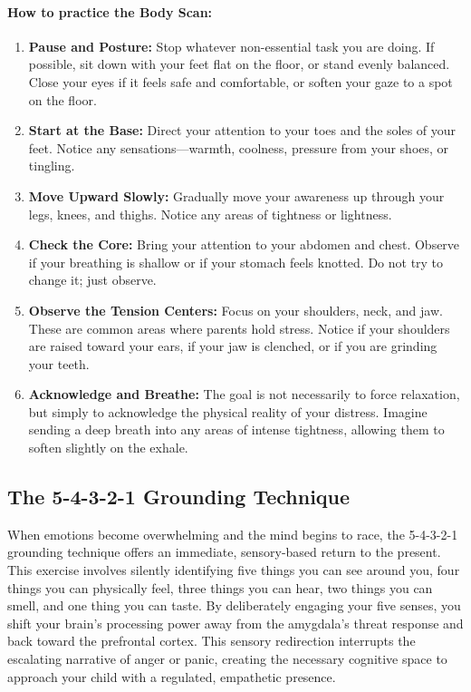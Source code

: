 \paragraph{How to practice the Body Scan:}
\begin{enumerate}
    \item \textbf{Pause and Posture:} Stop whatever non-essential task you are doing. 
    If possible, sit down with your feet flat on the floor, or stand evenly balanced. 
    Close your eyes if it feels safe and comfortable, or soften your gaze to a spot on the floor.
    \item \textbf{Start at the Base:} Direct your attention to your toes and the soles of your feet. 
    Notice any sensations---warmth, coolness, pressure from your shoes, or tingling.
    \item \textbf{Move Upward Slowly:} Gradually move your awareness up through your legs, knees, and thighs. 
    Notice any areas of tightness or lightness.
    \item \textbf{Check the Core:} Bring your attention to your abdomen and chest. 
    Observe if your breathing is shallow or if your stomach feels knotted. Do not try to change it; just observe.
    \item \textbf{Observe the Tension Centers:} Focus on your shoulders, neck, and jaw. 
    These are common areas where parents hold stress. 
    Notice if your shoulders are raised toward your ears, if your jaw is clenched, or if you are grinding your teeth.
    \item \textbf{Acknowledge and Breathe:} 
    The goal is not necessarily to force relaxation, but simply to acknowledge the physical reality of your distress. 
    Imagine sending a deep breath into any areas of intense tightness, allowing them to soften slightly on the exhale.
\end{enumerate}

\subsection{The 5-4-3-2-1 Grounding Technique}
When emotions become overwhelming and the mind begins to race, the 5-4-3-2-1 grounding technique offers an immediate, sensory-based return to the present.
This exercise involves silently identifying five things you can see around you, four things you can physically feel, three things you can hear, two things you can smell, and one thing you can taste.
By deliberately engaging your five senses, you shift your brain's processing power away from the amygdala's threat response and back toward the prefrontal cortex.
This sensory redirection interrupts the escalating narrative of anger or panic, creating the necessary cognitive space to approach your child with a regulated, empathetic presence.

